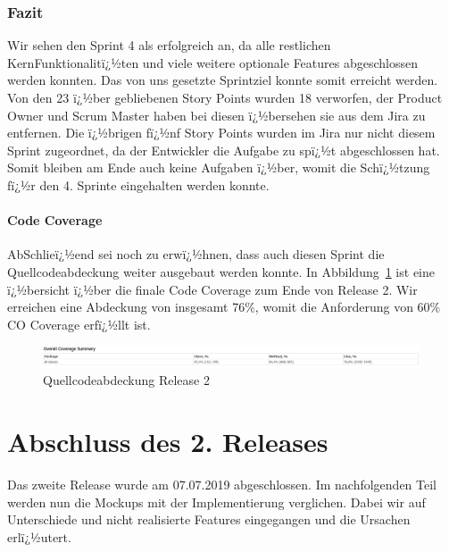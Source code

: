 \documentclass[12pt, titlepage]{scrartcl}
\newcommand{\Abb}[1]{%
	Abbildung\ \ref{#1}%
}
\begin{document}
			\subsubsection{Fazit}
			Wir sehen den Sprint 4 als erfolgreich an, da alle restlichen KernFunktionalitï¿½ten und viele weitere optionale Features abgeschlossen werden konnten. Das von uns gesetzte Sprintziel konnte somit erreicht werden. Von den 23 ï¿½ber gebliebenen Story Points wurden 18 verworfen, der Product Owner und Scrum Master haben bei diesen ï¿½bersehen sie aus dem Jira zu entfernen. Die ï¿½brigen fï¿½nf Story Points wurden im Jira nur nicht diesem Sprint zugeordnet, da der Entwickler die Aufgabe zu spï¿½t abgeschlossen hat. Somit bleiben am Ende auch keine Aufgaben ï¿½ber, womit die Schï¿½tzung fï¿½r den 4. Sprinte eingehalten werden konnte.
			
			\paragraph{Code Coverage}
			AbSchlieï¿½end sei noch zu erwï¿½hnen, dass auch diesen Sprint die Quellcodeabdeckung weiter ausgebaut werden konnte. In \Abb{CodeCoverageReleaseTwo} ist eine ï¿½bersicht ï¿½ber die finale Code Coverage zum Ende von Release 2. Wir erreichen eine Abdeckung von insgesamt 76\%, womit die Anforderung von 60\% CO Coverage erfï¿½llt ist.
			
			\begin{figure}[H] 
				\centering
				\includegraphics[width=1\textwidth]{Coverage_Sprint_4.PNG}
				\caption{Quellcodeabdeckung Release 2}
				\label{CodeCoverageReleaseTwo}
			\end{figure}
			
			\section{Abschluss des 2. Releases}
			Das zweite Release wurde am 07.07.2019 abgeschlossen. Im nachfolgenden Teil werden nun die Mockups mit der Implementierung verglichen. Dabei wir auf Unterschiede und nicht realisierte Features eingegangen und die Ursachen erlï¿½utert.
			
\end{document}
